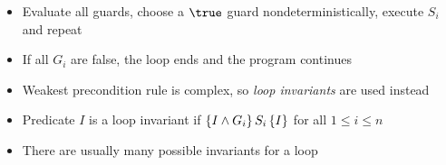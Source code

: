 \begin{itemize}
\begin{itemize}
		\item Evaluate all guards, choose a $ \true $ guard nondeterministically, execute $ S_i $ and repeat
		
		\item If all $ G_i $ are false, the loop ends and the program continues
		
		\item Weakest precondition rule is complex, so \textit{loop invariants} are used instead
		
		\item Predicate $ I $ is a loop invariant if $\left\lbrace I \land G_i \right\rbrace S_i \left\lbrace I \right\rbrace $ for all $ 1 \le i \le n $
		
		\item There are usually many possible invariants for a loop
		
	\end{itemize}
	
\end{itemize}